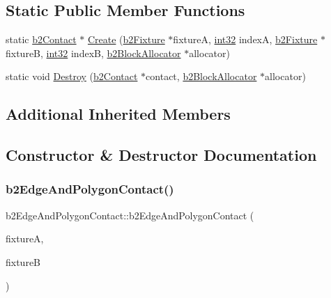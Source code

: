 \subsection*{Static Public Member Functions}
\begin{DoxyCompactItemize}
\item 
static \mbox{\hyperlink{classb2_contact}{b2\+Contact}} $\ast$ \mbox{\hyperlink{classb2_edge_and_polygon_contact_a3a0bcb2327e02bfc2079a734d8e9c8f7}{Create}} (\mbox{\hyperlink{classb2_fixture}{b2\+Fixture}} $\ast$fixtureA, \mbox{\hyperlink{b2_settings_8h_a43d43196463bde49cb067f5c20ab8481}{int32}} indexA, \mbox{\hyperlink{classb2_fixture}{b2\+Fixture}} $\ast$fixtureB, \mbox{\hyperlink{b2_settings_8h_a43d43196463bde49cb067f5c20ab8481}{int32}} indexB, \mbox{\hyperlink{classb2_block_allocator}{b2\+Block\+Allocator}} $\ast$allocator)
\item 
static void \mbox{\hyperlink{classb2_edge_and_polygon_contact_a83260c190706928518ab1a3040c0c515}{Destroy}} (\mbox{\hyperlink{classb2_contact}{b2\+Contact}} $\ast$contact, \mbox{\hyperlink{classb2_block_allocator}{b2\+Block\+Allocator}} $\ast$allocator)
\end{DoxyCompactItemize}
\subsection*{Additional Inherited Members}


\subsection{Constructor \& Destructor Documentation}
\mbox{\label{classb2_edge_and_polygon_contact_a79d9b012c4a0df7d5c3dcecd33df7d5f}} 
\subsubsection{\texorpdfstring{b2EdgeAndPolygonContact()}{b2EdgeAndPolygonContact()}}
{\footnotesize\ttfamily b2\+Edge\+And\+Polygon\+Contact\+::b2\+Edge\+And\+Polygon\+Contact (\begin{DoxyParamCaption}\item[{\mbox{\hyperlink{classb2_fixture}{b2\+Fixture}} $\ast$}]{fixtureA,  }\item[{\mbox{\hyperlink{classb2_fixture}{b2\+Fixture}} $\ast$}]{fixtureB }\end{DoxyParamCaption})}

